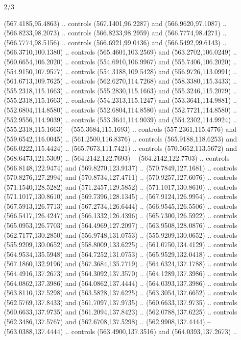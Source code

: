 \begin{flagdescription}{2/3}
\begin{scope}[xshift=0.5\flaglength,yshift=0.5\flagwidth,scale=\flagwidth/525.28]
\begin{scope}[y=0.1mm, x=0.1mm, yscale=-1,shift={(-381.5,-404)}]
  (567.4185,95.4863) .. controls (567.1401,96.2287) and (566.9620,97.1087) ..
  (566.8233,98.2073) .. controls (566.8233,98.2959) and (566.7774,98.4271) ..
  (566.7774,98.5156) .. controls (566.6921,99.0436) and (566.5492,99.6143) ..
  (566.3710,100.1380) .. controls (565.4601,103.2569) and (563.2702,106.0249) ..
  (560.6654,106.2020) .. controls (554.6910,106.9967) and (555.7406,106.2020) ..
  (554.9150,107.9577) .. controls (554.3188,109.5428) and (556.9726,113.0991) ..
  (561.6713,109.7625) .. controls (562.6270,114.7268) and (558.3380,115.3433) ..
  (555.2318,115.1663) .. controls (555.2830,115.1663) and (555.3246,115.2079) ..
  (555.2318,115.1663) .. controls (554.2313,115.1247) and (553.3641,114.9881) ..
  (552.6804,114.8580) .. controls (552.6804,114.8580) and (552.7721,114.8580) ..
  (552.9556,114.9039) .. controls (553.3641,114.9039) and (554.2302,114.9924) ..
  (555.2318,115.1663) -- (555.3684,115.1693) .. controls (557.2361,115.4776) and
  (559.6542,116.0045) .. (561.2500,116.8376) .. controls (565.9188,118.6253) and
  (566.0222,115.4424) .. (565.7673,111.7421) .. controls (570.5652,113.5672) and
  (568.6473,121.5309) .. (564.2142,122.7693) -- (564.2142,122.7703) .. controls
  (566.8148,122.9474) and (569.8270,123.9137) .. (570.7849,127.1681) .. controls
  (570.8276,127.2994) and (570.8734,127.4711) .. (570.9257,127.6076) .. controls
  (571.1540,128.5282) and (571.2457,129.5852) .. (571.1017,130.8610) .. controls
  (571.1017,130.8610) and (569.7396,128.1345) .. (567.9124,126.9954) .. controls
  (567.5913,126.7713) and (567.2734,126.6444) .. (566.9545,126.5506) .. controls
  (566.5417,126.4247) and (566.1332,126.4396) .. (565.7300,126.5922) .. controls
  (565.0953,126.7703) and (564.4969,127.2097) .. (563.9508,128.0876) .. controls
  (562.7177,130.2850) and (556.9748,131.0753) .. (555.9209,130.0652) .. controls
  (555.9209,130.0652) and (558.8009,133.6225) .. (561.0750,134.4129) .. controls
  (564.9534,135.5948) and (564.7252,131.0753) .. (565.9529,132.0418) .. controls
  (567.1860,132.9196) and (567.3684,135.7719) .. (564.6324,137.1788) .. controls
  (564.4916,137.2673) and (564.3092,137.3570) .. (564.1289,137.3986) .. controls
  (564.0862,137.3986) and (564.0862,137.4444) .. (564.0393,137.3986) .. controls
  (563.8110,137.5298) and (563.5828,137.6225) .. (563.3054,137.6652) .. controls
  (562.5769,137.8433) and (561.7097,137.9735) .. (560.6633,137.9735) .. controls
  (560.6633,137.9735) and (561.2094,137.8423) .. (562.0788,137.6225) .. controls
  (562.3486,137.5767) and (562.6708,137.5298) .. (562.9908,137.4444) --
  (563.0388,137.4444) .. controls (563.4900,137.3516) and (564.0393,137.2673) ..

\end{scope}
\end{scope}
\end{flagdescription}
